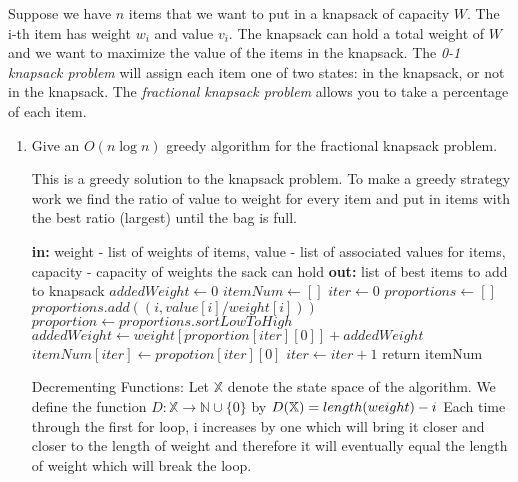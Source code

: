 \documentclass{article}
\newcommand{\N}{\mathbb{N}}
\begin{document}
\nextprob
Suppose we have $n$ items that we want to put in a knapsack of capacity $W$.  The i-th item has
weight $w_i$ and value $v_i$.  The knapsack can hold a total weight of $W$ and
we want to maximize the value of the items in the knapsack.
The \emph{0-1 knapsack problem} will assign each item one of two states: in the
knapsack, or not in the knapsack.  The \emph{fractional knapsack problem} allows
you to take a percentage of each item.
\begin{enumerate}
    \item Give an $O(n\log n)$ greedy algorithm for the fractional knapsack problem.
    \newline\newline
    
    This is a greedy solution to the knapsack problem. To make a greedy strategy work we find the ratio of value to weight for every item and put in items with the best ratio (largest) until the bag is full.
    \begin{algorithm}
    \begin{algorithmic}
    \newline
    	\textbf{in: } weight - list of weights of items, value - list of associated values for items, capacity - capacity of weights the sack can hold\newline
	\textbf{out: } list of best items to add to knapsack
	\State $addedWeight \gets 0$
	\State $itemNum \gets []$
	\State $iter \gets 0$
	\State $proportions \gets []$
		\State $proportions.add((i, value[i]/weight[i])) $
	\EndFor
	\State $proportion \gets proportions.sortLowToHigh$
		\State $addedWeight \gets weight[proportion[iter][0]] + addedWeight$
		\State $itemNum[iter] \gets propotion[iter][0]$ 
		\State $iter \gets iter + 1$
	\EndWhile
	\State return itemNum
    \EndProcedure
    \end{algorithmic}
    \end{algorithm}
    \newline
    Decrementing Functions: \newline
     Let $\mathbb{X}$ denote the state space of the algorithm. We define the function $D \colon \mathbb{X} \to \N \cup \{0\}$ by $D( \mathbb{X}) = length(weight) -i\newline $
   Each time through the first for loop, i increases by one which will bring it closer and closer to the length of weight and therefore it will eventually equal the length of weight which will break the loop.

\end{enumerate}
\end{document}
